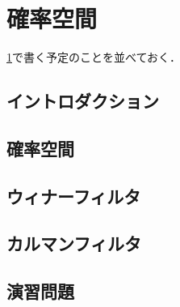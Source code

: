 \documentclass[../../main]{subfiles}
\begin{document}
\chapter{確率空間}
\label{chapter:probability_space}

\begin{lead}
  \cref{chapter:probability_space}で書く予定のことを並べておく．
\end{lead}

\section{イントロダクション}

\section{確率空間}

\section{ウィナーフィルタ}

\section{カルマンフィルタ}

\section*{演習問題}
\end{document}
